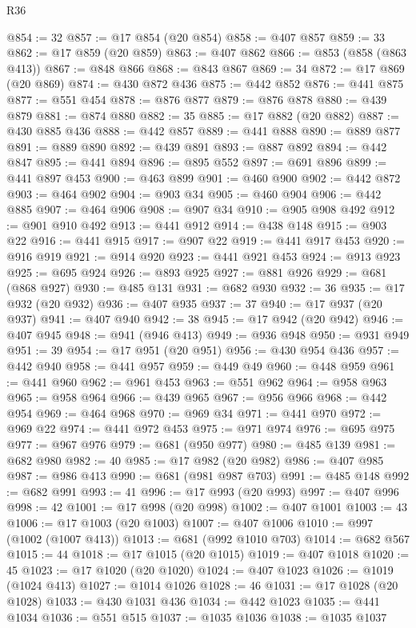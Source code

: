 \begin{lexlean}{R36}
\begin{coremodule}
@854 := 32
@857 := @17 @854 (@20 @854)
@858 := @407 @857
@859 := 33
@862 := @17 @859 (@20 @859)
@863 := @407 @862
@866 := @853 (@858 (@863 @413))
@867 := @848 @866
@868 := @843 @867
@869 := 34
@872 := @17 @869 (@20 @869)
@874 := @430 @872 @436
@875 := @442 @852
@876 := @441 @875
@877 := @551 @454
@878 := @876 @877
@879 := @876 @878
@880 := @439 @879
@881 := @874 @880
@882 := 35
@885 := @17 @882 (@20 @882)
@887 := @430 @885 @436
@888 := @442 @857
@889 := @441 @888
@890 := @889 @877
@891 := @889 @890
@892 := @439 @891
@893 := @887 @892
@894 := @442 @847
@895 := @441 @894
@896 := @895 @552
@897 := @691 @896
@899 := @441 @897 @453
@900 := @463 @899
@901 := @460 @900
@902 := @442 @872
@903 := @464 @902
@904 := @903 @34
@905 := @460 @904
@906 := @442 @885
@907 := @464 @906
@908 := @907 @34
@910 := @905 @908 @492
@912 := @901 @910 @492
@913 := @441 @912
@914 := @438 @148
@915 := @903 @22
@916 := @441 @915
@917 := @907 @22
@919 := @441 @917 @453
@920 := @916 @919
@921 := @914 @920
@923 := @441 @921 @453
@924 := @913 @923
@925 := @695 @924
@926 := @893 @925
@927 := @881 @926
@929 := @681 (@868 @927)
@930 := @485 @131
@931 := @682 @930
@932 := 36
@935 := @17 @932 (@20 @932)
@936 := @407 @935
@937 := 37
@940 := @17 @937 (@20 @937)
@941 := @407 @940
@942 := 38
@945 := @17 @942 (@20 @942)
@946 := @407 @945
@948 := @941 (@946 @413)
@949 := @936 @948
@950 := @931 @949
@951 := 39
@954 := @17 @951 (@20 @951)
@956 := @430 @954 @436
@957 := @442 @940
@958 := @441 @957
@959 := @449 @49
@960 := @448 @959
@961 := @441 @960
@962 := @961 @453
@963 := @551 @962
@964 := @958 @963
@965 := @958 @964
@966 := @439 @965
@967 := @956 @966
@968 := @442 @954
@969 := @464 @968
@970 := @969 @34
@971 := @441 @970
@972 := @969 @22
@974 := @441 @972 @453
@975 := @971 @974
@976 := @695 @975
@977 := @967 @976
@979 := @681 (@950 @977)
@980 := @485 @139
@981 := @682 @980
@982 := 40
@985 := @17 @982 (@20 @982)
@986 := @407 @985
@987 := @986 @413
@990 := @681 (@981 @987 @703)
@991 := @485 @148
@992 := @682 @991
@993 := 41
@996 := @17 @993 (@20 @993)
@997 := @407 @996
@998 := 42
@1001 := @17 @998 (@20 @998)
@1002 := @407 @1001
@1003 := 43
@1006 := @17 @1003 (@20 @1003)
@1007 := @407 @1006
@1010 := @997 (@1002 (@1007 @413))
@1013 := @681 (@992 @1010 @703)
@1014 := @682 @567
@1015 := 44
@1018 := @17 @1015 (@20 @1015)
@1019 := @407 @1018
@1020 := 45
@1023 := @17 @1020 (@20 @1020)
@1024 := @407 @1023
@1026 := @1019 (@1024 @413)
@1027 := @1014 @1026
@1028 := 46
@1031 := @17 @1028 (@20 @1028)
@1033 := @430 @1031 @436
@1034 := @442 @1023
@1035 := @441 @1034
@1036 := @551 @515
@1037 := @1035 @1036
@1038 := @1035 @1037

\end{coremodule}
\end{lexlean}
